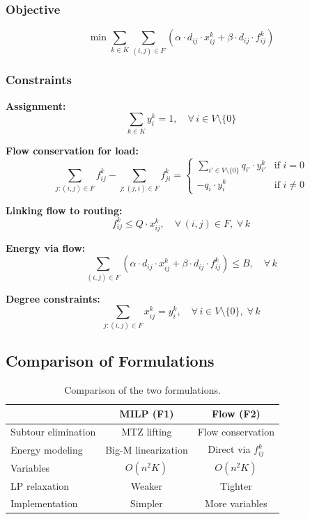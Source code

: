 \documentclass[12pt,a4paper]{article}
\begin{document}
\subsubsection{Objective}
\begin{equation}
\min \sum_{k\in K}\sum_{(i,j)\in F} (\alpha\cdot d_{ij}\cdot x_{ij}^k + \beta\cdot d_{ij}\cdot f_{ij}^k)
\end{equation}

\subsubsection{Constraints}
\textbf{Assignment:}
\begin{equation}
\sum_{k\in K} y_i^k = 1, \quad \forall\, i\in V\setminus\{0\}
\end{equation}

\textbf{Flow conservation for load:}
\begin{equation}
\sum_{j:(i,j)\in F} f_{ij}^k - \sum_{j:(j,i)\in F} f_{ji}^k = 
\begin{cases}
  \sum_{i'\in V\setminus\{0\}} q_{i'}\cdot y_{i'}^k & \text{if } i=0\\
  -q_i\cdot y_i^k & \text{if } i\neq 0
\end{cases}
\end{equation}

\textbf{Linking flow to routing:}
\begin{equation}
f_{ij}^k \leq Q\cdot x_{ij}^k, \quad \forall\, (i,j)\in F,\; \forall\, k
\end{equation}

\textbf{Energy via flow:}
\begin{equation}
\sum_{(i,j)\in F}(\alpha\cdot d_{ij}\cdot x_{ij}^k + \beta\cdot d_{ij}\cdot f_{ij}^k) \leq B, \quad \forall\, k
\end{equation}

\textbf{Degree constraints:}
\begin{equation}
\sum_{j:(i,j)\in F} x_{ij}^k = y_i^k, \quad \forall\, i\in V\setminus\{0\},\; \forall\, k
\end{equation}

\subsection{Comparison of Formulations}
\begin{table}[H]\centering
\begin{tabular}{lcc}\toprule
& \textbf{MILP (F1)} & \textbf{Flow (F2)} \\\midrule
Subtour elimination & MTZ lifting & Flow conservation \\
Energy modeling & Big-M linearization & Direct via $f_{ij}^k$ \\
Variables & $O(n^2K)$ & $O(n^2K)$ \\
LP relaxation & Weaker & Tighter \\
Implementation & Simpler & More variables \\
\bottomrule
\end{tabular}
\caption{Comparison of the two formulations.}
\end{table}
\end{document}
